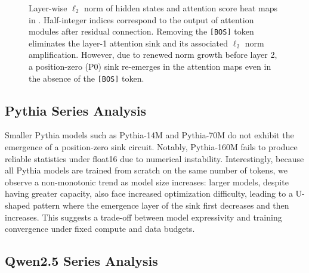 \documentclass[]{template}
\theoremstyle{plain}
\theoremstyle{definition}
\theoremstyle{remark}
\begin{document}
\begin{figure}[h]
\begin{minipage}[b]{0.48\linewidth}
\begin{subfigure}[b]{0.47\linewidth}
        \end{subfigure}
    \end{minipage}
    \caption{Layer-wise $\ell_2$ norm of hidden states and attention score heat maps in . Half-integer indices correspond to the output of attention modules after residual connection. Removing the \texttt{[BOS]} token eliminates the layer-1 attention sink and its associated $\ell_2$ norm amplification. However, due to renewed norm growth before layer 2, a position-zero (P0) sink re-emerges in the attention maps even in the absence of the \texttt{[BOS]} token.}
    \label{fig-mistral}
    \vspace{-1em}
\end{figure}

\newpage
\FloatBarrier

\newpage

\subsection{Pythia Series Analysis}

Smaller Pythia models such as Pythia-14M and Pythia-70M do not exhibit the emergence of a position-zero sink circuit. Notably, Pythia-160M fails to produce reliable statistics under float16 due to numerical instability. Interestingly, because all Pythia models are trained from scratch on the same number of tokens, we observe a non-monotonic trend as model size increases: larger models, despite having greater capacity, also face increased optimization difficulty, leading to a U-shaped pattern where the emergence layer of the sink first decreases and then increases. This suggests a trade-off between model expressivity and training convergence under fixed compute and data budgets.







\FloatBarrier

\subsection{Qwen2.5 Series Analysis}
\end{document}
